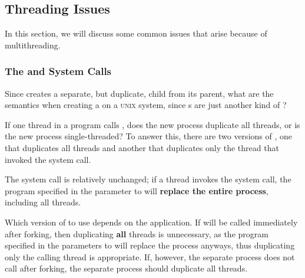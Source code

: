 \subsection{Threading Issues}\label{subsec:Threading_Issues}
In this section, we will discuss some common issues that arise because of multithreading.

\subsubsection{The \texorpdfstring{}{\texttt{fork()}} and \texorpdfstring{}{\texttt{exec()}} System Calls}\label{subsubsec:Fork_Exec_System_Calls}
Since  creates a separate, but duplicate, child  from its parent, what are the semantics when creating a  on a \textsc{unix} system, since s are just another kind of ?

If one thread in a program calls , does the new process duplicate all threads, or is the new process single-threaded?
To answer this, there are two versions of , one that duplicates all threads and another that duplicates only the thread that invoked the  system call.

The  system call is relatively unchanged; if a thread invokes the  system call, the program specified in the parameter to  will \textbf{replace the entire process}, including all threads.

Which version of  to use depends on the application.
If  will be called immediately after forking, then duplicating \textbf{all} threads is unnecessary, as the program specified in the parameters to  will replace the process anyways, thus duplicating only the calling thread is appropriate.
If, however, the separate process does not call  after forking, the separate process should duplicate all threads.

